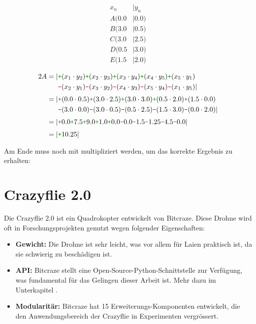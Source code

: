\begin{minipage}[t]{0.2\textwidth}
    \begin{align*}
        x_n &| y_n \\[3pt]
        A(0.0 &| 0.0) \\
        B(3.0 &| 0.5) \\
        C(3.0 &| 2.5) \\
        D(0.5 &| 3.0) \\
        E(1.5 &| 2.0)
    \end{align*}
\end{minipage}
\vline
\begin{minipage}[t]{0.7\textwidth}
    \begin{align*}
        2A = |&\cp (x_1 \cdot y_2) \cp (x_2 \cdot y_3) \cp (x_3 \cdot y_4) \cp (x_4 \cdot y_5) \cp (x_5 \cdot y_1) \\
        &\cm (x_2 \cdot y_1) \cm (x_3 \cdot y_2) \cm (x_4 \cdot y_3) \cm (x_5 \cdot y_4) \cm (x_1 \cdot y_5)| \\[3pt]
        = |&\cp (0.0 \cdot 0.5) \cp (3.0 \cdot 2.5) \cp (3.0 \cdot 3.0) \cp (0.5 \cdot 2.0) \cp (1.5 \cdot 0.0) \\
        &\cm (3.0 \cdot 0.0) \cm (3.0 \cdot 0.5) \cm (0.5 \cdot 2.5) \cm (1.5 \cdot 3.0) \cm (0.0 \cdot 2.0)| \\[3pt]
        = |&\cp 0.0 \cp 7.5 \cp 9.0 \cp 1.0 \cp 0.0 \cm 0.0 \cm 1.5 \cm 1.25 \cm 4.5 \cm 0.0| \\[3pt]
        = |&\cp 10.25|
    \end{align*}
\end{minipage}

Am Ende muss noch mit  multipliziert werden, um das korrekte Ergebnis zu erhalten: 

\section{Crazyflie 2.0}
Die Crazyflie 2.0 ist ein Quadrokopter entwickelt von Bitcraze. Diese Drohne wird oft in Forschungsprojekten genutzt wegen folgender Eigenschaften:

\begin{itemize}
    \item \textbf{Gewicht:} Die Drohne ist sehr leicht, was vor allem für Laien praktisch ist, da sie schwierig zu beschädigen ist.
    \item \textbf{API:} Bitcraze stellt eine Open-Source-Python-Schnittstelle zur Verfügung, was fundamental für das Gelingen dieser Arbeit ist. Mehr dazu im Unterkapitel .
    \item \textbf{Modularitär:} Bitcraze hat 15 Erweiterungs-Komponenten entwickelt, die den Anwendungsbereich der Crazyflie in Experimenten vergrössert.
\end{itemize}

